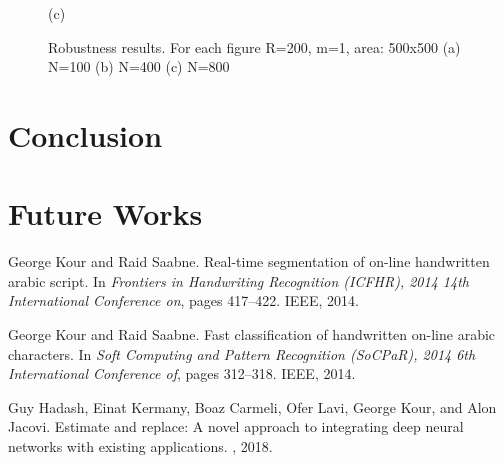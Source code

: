 \documentclass{article}
\begin{document}
\begin{figure}[!htb]
	\begin{center}
		(c)
	\end{center}
	\endminipage
	\caption{Robustness results. For each figure R=200, m=1, area: 500x500 (a) N=100 (b) N=400 (c) N=800}
\end{figure}

\section{Conclusion}

\section{Future Works}


  


\begin{thebibliography}{1}

George Kour and Raid Saabne.
\newblock Real-time segmentation of on-line handwritten arabic script.
\newblock In {\em Frontiers in Handwriting Recognition (ICFHR), 2014 14th
  International Conference on}, pages 417--422. IEEE, 2014.

George Kour and Raid Saabne.
\newblock Fast classification of handwritten on-line arabic characters.
\newblock In {\em Soft Computing and Pattern Recognition (SoCPaR), 2014 6th
  International Conference of}, pages 312--318. IEEE, 2014.

Guy Hadash, Einat Kermany, Boaz Carmeli, Ofer Lavi, George Kour, and Alon
  Jacovi.
\newblock Estimate and replace: A novel approach to integrating deep neural
  networks with existing applications.
, 2018.

\end{thebibliography}
\end{document}
